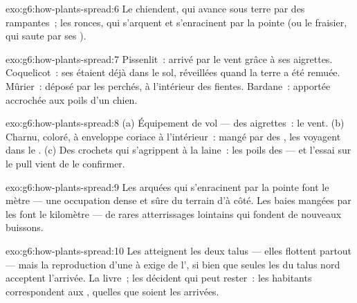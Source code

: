 \begin{solution}{exo:g6:how-plants-spread:6}
Le chiendent, qui avance sous terre par des  rampantes~; les
ronces, qui s'arquent et s'enracinent par la pointe (ou le fraisier,
qui saute par ses ).
\end{solution}

\begin{solution}{exo:g6:how-plants-spread:7}
Pissenlit~: arrivé par le vent grâce à ses aigrettes. Coquelicot~:
ses  étaient déjà dans le sol, réveillées quand la terre a
été remuée. Mûrier~: déposé par les  perchés,  à
l'intérieur des fientes. Bardane~: apportée accrochée aux poils d'un
chien.
\end{solution}

\begin{solution}{exo:g6:how-plants-spread:8}
(a) Équipement de vol --- des aigrettes~: le vent. (b) Charnu,
coloré,  à enveloppe coriace à l'intérieur~: mangé par des
, les  voyagent dans le . (c) Des
crochets qui s'agrippent à la laine~: les poils des  --- et
l'essai sur le pull vient de le confirmer.
\end{solution}

\begin{solution}{exo:g6:how-plants-spread:9}
Les  arquées qui s'enracinent par la pointe font le mètre ---
une occupation dense et sûre du terrain d'à côté. Les baies mangées
par les  font le kilomètre --- de rares atterrissages
lointains qui fondent de nouveaux buissons.
\end{solution}

\begin{solution}{exo:g6:how-plants-spread:10}
Les  atteignent les deux talus --- elles flottent partout ---
mais la reproduction d'une  à  exige de l', si
bien que seules les  du talus nord acceptent l'arrivée. La
 livre~; les  décident qui peut rester~: les
habitants correspondent aux , quelles que soient les
arrivées.
\end{solution}


